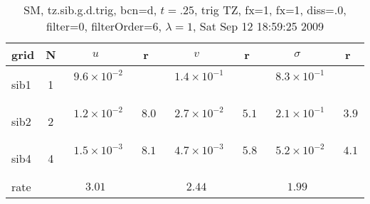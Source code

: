 \begin{table}[hbt]\tableFont %
\begin{center}
\begin{tabular}{|l|c|c|c|c|c|c|c|} \hline 
grid  & N &  $u$  & r &  $v$  & r &  $\sigma$   & r \\ \hline 
                sib1 &     1 & ~$9.6\times10^{ -2}$~ &           & ~$1.4\times10^{ -1}$~ &           & ~$8.3\times10^{ -1}$~ &            \\ \hline
                sib2 &     2 & ~$1.2\times10^{ -2}$~ & ~$  8.0$~ & ~$2.7\times10^{ -2}$~ & ~$  5.1$~ & ~$2.1\times10^{ -1}$~ & ~$  3.9$~  \\ \hline
                sib4 &     4 & ~$1.5\times10^{ -3}$~ & ~$  8.1$~ & ~$4.7\times10^{ -3}$~ & ~$  5.8$~ & ~$5.2\times10^{ -2}$~ & ~$  4.1$~  \\ \hline
    rate             &       &       $3.01$         &       &       $2.44$         &       &       $1.99$         &        \\ \hline
\end{tabular}
\caption{SM, tz.sib.g.d.trig, bcn=d, $t=.25$, trig TZ, fx=1, fx=1, diss=.0, filter=0, filterOrder=6, $\lambda=1$, Sat Sep 12 18:59:25 2009}\label{table:tz.sib.g.d.trig}
\end{center}
\end{table}
